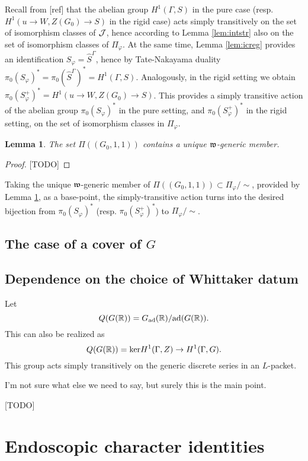 \documentclass{article}
\newtheorem{lem}[thm]{Lemma}
\theoremstyle{definition}
\numberwithin{equation}{section}
\renewcommand{\-}{\hyp{}}
\newcommand{\warn}[1]{{\leavevmode\color{red}[#1]}}
\begin{document}
Recall from \warn{ref} that the abelian group $H^1(\Gamma,S)$ in the pure case (resp. $H^1(u \to W,Z(G_0) \to S)$ in the rigid case) acts simply transitively on the set of isomorphism classes of $\mathcal{J}$, hence according to Lemma \ref{lem:intstr} also on the set of isomorphism classes of $\Pi_\varphi$. At the same time, Lemma \ref{lem:icreg} provides an identification $S_\varphi = \hat S^\Gamma$, hence by Tate-Nakayama duality $\pi_0(S_\varphi)^*=\pi_0(\hat S^\Gamma)^*=H^1(\Gamma,S)$. Analogously, in the rigid setting we obtain $\pi_0(S_\varphi^+)^*=H^1(u \to W,Z(G_0) \to S)$. This provides a simply transitive action of the abelian group $\pi_0(S_\varphi)^*$ in the pure setting, and $\pi_0(S_\varphi^+)^*$ in the rigid setting, on the set of isomorphism classes in $\Pi_\varphi$.

\begin{lem} \label{lem:uniqgen}
The set $\Pi((G_0,1,1))$ contains a unique $\mathfrak{w}$-generic member.
\end{lem}
\begin{proof}
\warn{TODO}
\end{proof}

Taking the unique $\mathfrak{w}$-generic member of $\Pi((G_0,1,1)) \subset \Pi_\varphi/\!\!\sim$, provided by Lemma \ref{lem:uniqgen}, as a base-point, the simply-transitive action turns into the desired bijection from $\pi_0(S_\varphi)^*$ (resp. $\pi_0(S_\varphi^+)^*$) to $\Pi_\varphi/\!\!\sim$.

\subsection{The case of a cover of $G$} \label{sub:packetcover}

\subsection{Dependence on the choice of Whittaker datum} \label{sub:whit}

Let
$$
Q(G(\mathbb{R}))=G_{\mathrm{ad}}(\mathbb{R})/\mathrm{ad}(G(\mathbb{R})).
$$
This can also be realized as
$$
Q(G(\mathbb{R}))=\mathrm{ker}H^1(\Gamma,Z)\rightarrow H^1(\Gamma,G).
$$
This group acts simply transitively on the generic discrete series in an $L$-packet.

I'm not sure what else we need to say, but surely this is the main point.

\warn{TODO}

\section{Endoscopic character identities}
\end{document}
